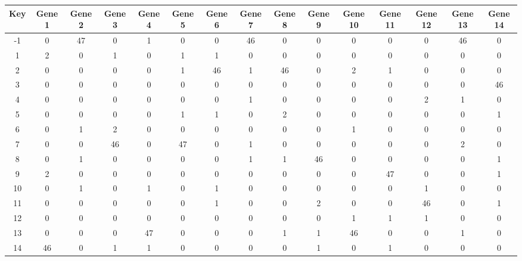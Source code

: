 \begin{tabular}{|c|c|c|c|c|c|c|c|c|c|c|c|c|c|c|}
\hline
Key & Gene 1 & Gene 2 & Gene 3 & Gene 4 & Gene 5 & Gene 6 & Gene 7 & Gene 8 & Gene 9 & Gene 10 & Gene 11 & Gene 12 & Gene 13 & Gene 14 \\
\hline
-1 & 0 & 47 & 0 & 1 & 0 & 0 & 46 & 0 & 0 & 0 & 0 & 0 & 46 & 0 \\
1 & 2 & 0 & 1 & 0 & 1 & 1 & 0 & 0 & 0 & 0 & 0 & 0 & 0 & 0 \\
2 & 0 & 0 & 0 & 0 & 1 & 46 & 1 & 46 & 0 & 2 & 1 & 0 & 0 & 0 \\
3 & 0 & 0 & 0 & 0 & 0 & 0 & 0 & 0 & 0 & 0 & 0 & 0 & 0 & 46 \\
4 & 0 & 0 & 0 & 0 & 0 & 0 & 1 & 0 & 0 & 0 & 0 & 2 & 1 & 0 \\
5 & 0 & 0 & 0 & 0 & 1 & 1 & 0 & 2 & 0 & 0 & 0 & 0 & 0 & 1 \\
6 & 0 & 1 & 2 & 0 & 0 & 0 & 0 & 0 & 0 & 1 & 0 & 0 & 0 & 0 \\
7 & 0 & 0 & 46 & 0 & 47 & 0 & 1 & 0 & 0 & 0 & 0 & 0 & 2 & 0 \\
8 & 0 & 1 & 0 & 0 & 0 & 0 & 1 & 1 & 46 & 0 & 0 & 0 & 0 & 1 \\
9 & 2 & 0 & 0 & 0 & 0 & 0 & 0 & 0 & 0 & 0 & 47 & 0 & 0 & 1 \\
10 & 0 & 1 & 0 & 1 & 0 & 1 & 0 & 0 & 0 & 0 & 0 & 1 & 0 & 0 \\
11 & 0 & 0 & 0 & 0 & 0 & 1 & 0 & 0 & 2 & 0 & 0 & 46 & 0 & 1 \\
12 & 0 & 0 & 0 & 0 & 0 & 0 & 0 & 0 & 0 & 1 & 1 & 1 & 0 & 0 \\
13 & 0 & 0 & 0 & 47 & 0 & 0 & 0 & 1 & 1 & 46 & 0 & 0 & 1 & 0 \\
14 & 46 & 0 & 1 & 1 & 0 & 0 & 0 & 0 & 1 & 0 & 1 & 0 & 0 & 0 \\
\hline
\end{tabular}